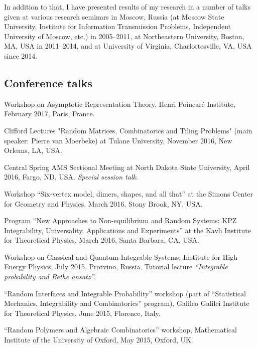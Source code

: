 \documentclass[letterpaper,11pt]{article}
\begin{document}
In addition to that, I have presented results of my research in a number of talks given at various research seminars in Moscow, Russia (at Moscow State University, Institute for Information Transmission Problems, Independent University of Moscow, etc.) in 2005--2011, at Northeastern University, Boston, MA, USA in 2011--2014, and
at University of Virginia, Charlottesville, VA, USA since 2014.

\subsection*{Conference talks}

\begin{etaremune}

\item 
	Workshop on Asymptotic Representation Theory, Henri Poincar\'e Institute, February 2017, Paris, France.

\item Clifford Lectures 
	"Random Matrices, Combinatorics and Tiling Problems" 
	(main speaker: Pierre van Moerbeke) at Tulane University, 
	November 2016, New Orleans, LA, USA.

\item Central Spring AMS Sectional Meeting 
at 
North Dakota State University, April 2016, 
Fargo, ND, USA. \emph{Special session talk}.

\item 
Workshop 
``Six-vertex model, dimers, shapes, and all that''
at the
Simons Center for Geometry and Physics,
March 2016, Stony Brook, NY, USA.

\item 
Program ``New Approaches to Non-equilibrium and Random Systems: 
KPZ Integrability, Universality, Applications and Experiments''
at the Kavli Institute for Theoretical Physics, 
March 2016, Santa Barbara, CA, USA.

\item Workshop on Classical and Quantum Integrable Systems, 
Institute for High Energy Physics, July 2015, Protvino, Russia.
Tutorial lecture \emph{``Integrable probability and Bethe ansatz''}.

\item 
``Random Interfaces and Integrable Probability'' workshop (part of 
``Statistical Mechanics, Integrability and Combinatorics'' program), 
Galileo Galilei Institute for Theoretical Physics, June 2015, Florence, Italy.

\item ``Random Polymers and Algebraic Combinatorics'' workshop, 
Mathematical Institute of the University of Oxford, May 2015, Oxford, UK.


\end{etaremune}
\end{document}
